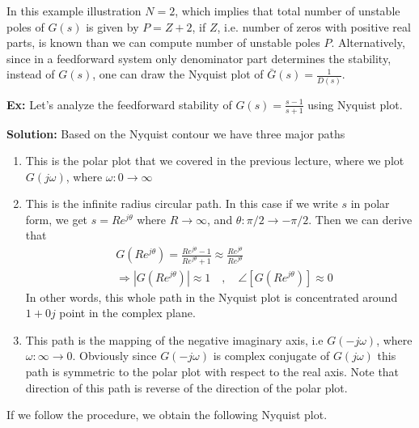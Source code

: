 \documentclass[twoside]{article}
\begin{document}
\vspace{6 pt}

In this example illustration $N = 2$, which implies that total number
of unstable poles of $G(s)$ is given by $P = Z + 2$, if $Z$,
i.e. number of zeros with positive real parts, is known than
we can compute number of unstable poles $P$. Alternatively, 
since in a feedforward system only denominator part determines
the stability, instead of $G(s)$, one can draw the Nyquist plot of 
$\bar{G}(s) = \frac{1}{D(s)}$.

\newpage

\textbf{Ex:} Let's analyze the feedforward stability of $G(s) =
\frac{s-1}{s+1}$ using Nyquist plot. 

\textbf{Solution:} Based on the Nyquist contour we have three major
paths
%
\begin{enumerate}
  \item This is the polar plot that we covered in the previous
    lecture, where we plot $G(j \omega)$, where $\omega : 0 \to \infty$
  \item This is the infinite radius circular path. In this case
   if we write $s$ in polar form, we get $s = R e^{j \theta}$
    where $R \to \infty$, and $\theta : \pi/2 \to -\pi/2$. Then 
   we can derive that  
   \begin{align*}
     & G \left( R e^{j \theta} \right) = 
     \frac{R e^{j \theta} - 1}{R e^{j \theta} + 1} 
     \approx \frac{R e^{j \theta}} {R e^{j \theta}}
       \\
    &\Rightarrow | G \left( R e^{j \theta} \right) | \approx 1
   \quad , \quad \angle [ G \left( R e^{j \theta} \right) ] \approx 0
   \end{align*}
  In other words, this whole path in the Nyquist plot
  is concentrated around $1 + 0 j$ point in the complex plane.
  \item This path is the mapping of the negative imaginary axis, 
  i.e $G(-j \omega)$, where $\omega : \infty \to 0$. Obviously
  since $G(-j \omega)$ is complex conjugate of $G(j \omega)$
  this path is symmetric to the polar plot with respect to the 
  real axis. Note that direction of this path is reverse of the
  direction of the  polar plot.
\end{enumerate}

  If we follow the procedure, we obtain the following Nyquist plot. 

\vspace{6 pt}
\end{document}
